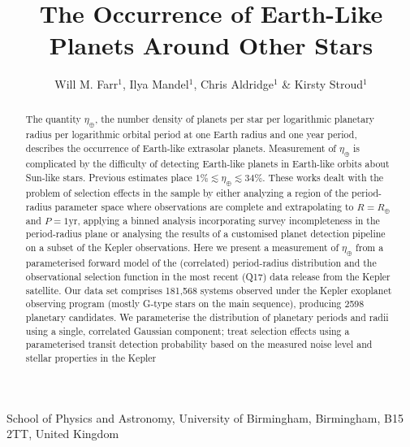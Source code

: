 \documentclass{nature}
\newcommand{\etaearth}{\eta_\oplus}
\newcommand{\REarth}{R_\oplus}
\begin{document}
\title{The Occurrence of Earth-Like Planets Around Other Stars}

\author{Will M. Farr$^{1}$, Ilya Mandel$^{1}$, Chris Aldridge$^{1}$ \& Kirsty Stroud$^{1}$}

\maketitle

\begin{affiliations}
\item School of Physics and Astronomy, University of Birmingham, Birmingham, B15 2TT, United Kingdom
\end{affiliations}

\begin{abstract}
  The quantity $\etaearth$, the number density of planets per star per
  logarithmic planetary radius per logarithmic orbital period at one
  Earth radius and one year period, describes the occurrence of
  Earth-like extrasolar planets.  Measurement of $\etaearth$ is
  complicated by the difficulty of detecting Earth-like planets in
  Earth-like orbits about Sun-like stars.  Previous
  estimates\cite{Catanzarite2011,Traub2012,Dong2013,Petigura2013,Foreman-Mackey2014}
  place $1\% \lesssim \etaearth \lesssim 34\%$.  These works dealt
  with the problem of selection effects in the sample by either
  analyzing a region of the period-radius parameter space where
  observations are complete and extrapolating to $R = \REarth$ and $P
  = 1 \mathrm{yr}$\cite{Catanzarite2011,Traub2012}, applying a binned
  analysis incorporating survey incompleteness in the period-radius
  plane\cite{Dong2013,Petigura2013} or analysing the results of a
  customised planet detection pipeline on a subset of the Kepler
  observations\cite{Petigura2013,Foreman-Mackey2014}.  Here we present
  a measurement of $\etaearth$ from a parameterised forward model of the
  (correlated) period-radius distribution and the observational
  selection function in the most recent (Q17) data release from the
  Kepler satellite\cite{Borucki2010,Borucki2011,Batalha2013}.  Our
  data set comprises 181,568 systems observed under the Kepler
  exoplanet observing program (mostly G-type stars on the main
  sequence\cite{Batalha2010}), producing 2598 planetary candidates.
  We parameterise the distribution of planetary periods and radii
  using a single, correlated Gaussian component; treat selection
  effects using a parameterised transit detection probability based on
  the measured noise level and stellar properties in the Kepler

\end{abstract}
\end{document}
